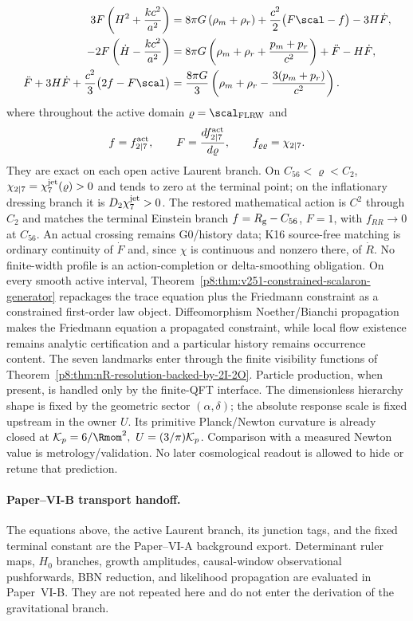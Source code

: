 \documentclass[12pt,a4paper]{article}
\begin{document}
\begin{align}
3F\left(H^2+\frac{k c^2}{a^2}\right)
&=
8\pi G\,(\rho_m+\rho_r)
+\frac{c^2}{2}\bigl(F\scal-f\bigr)
-3H\dot F,
\\
-2F\left(\dot H-\frac{k c^2}{a^2}\right)
&=
8\pi G\left(\rho_m+\rho_r+\frac{p_m+p_r}{c^2}\right)
+\ddot F-H\dot F,
\\
\ddot F+3H\dot F+\frac{c^2}{3}\bigl(2f-F\scal\bigr)
&=
\frac{8\pi G}{3}
\left(
\rho_m+\rho_r-\frac{3(p_m+p_r)}{c^2}
\right).
\end{align}
where throughout the active domain \(\varrho=\scal_{\rm FLRW}\) and
\[
 f=f_{2\mid7}^{\rm act},
 \qquad
 F=\frac{df_{2\mid7}^{\rm act}}{d\varrho},
 \qquad
 f_{\varrho\varrho}=\chi_{2\mid7}.
\]
They are exact on each open active Laurent branch.  On
$C_{56}<\varrho<C_2$, $\chi_{2\mid7}=\chi_7^{\rm jet}(\varrho)>0$ and tends
to zero at the terminal point; on the inflationary dressing branch it is
$D_2\chi_7^{\rm jet}>0$.  The restored mathematical action is $C^2$ through
$C_2$ and matches the terminal Einstein branch $f=R_{\rm g}-C_{56}$,
$F=1$, with $f_{RR}\to0$ at $C_{56}$.  An actual crossing remains
G0/history data; K16 source-free matching is ordinary continuity of $\dot F$
and, since $\chi$ is continuous and nonzero there, of $\dot R$.  No
finite-width profile is an action-completion or delta-smoothing obligation.  On every
smooth active interval, Theorem~\ref{p8:thm:v251-constrained-scalaron-generator}
repackages the trace equation plus the Friedmann constraint as a constrained
first-order law object.  Diffeomorphism Noether/Bianchi propagation makes the
Friedmann equation a propagated constraint, while local flow existence remains
analytic certification and a particular history remains occurrence content.
The seven
landmarks enter through the finite visibility functions of
Theorem~\ref{p8:thm:nR-resolution-backed-by-2I-2O}.  Particle production, when
present, is handled only by the finite-QFT interface.  The dimensionless hierarchy shape is fixed by the geometric sector
\((\alpha,\delta)\); the absolute response scale is fixed upstream in the owner \(U\).  Its primitive Planck/Newton curvature is already closed at
\(\mathcal K_p=6/\Rmom^2,\ U=(3/\pi)\mathcal K_p\).  Comparison with a measured Newton value is metrology/validation.
No later cosmological readout is allowed
to hide or retune that prediction.

\paragraph{Paper--VI-B transport handoff.}
The equations above, the active Laurent branch, its junction tags, and the
fixed terminal constant are the Paper--VI-A background export.  Determinant
ruler maps, \(H_0\) branches, growth amplitudes, causal-window observational
pushforwards, BBN reduction, and likelihood propagation are evaluated in
Paper~VI-B.  They are not repeated here and do not enter the derivation of the
gravitational branch.
\end{document}
